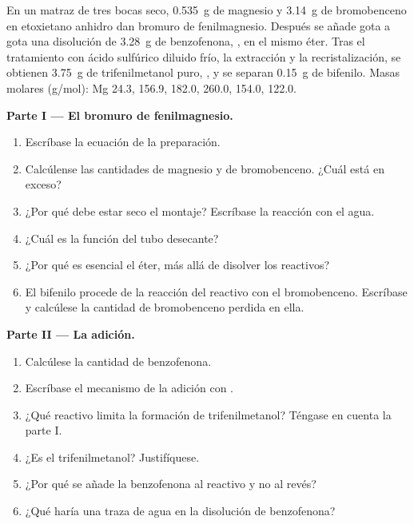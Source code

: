 \begin{problem}
\label{pb:b1:organomagnesium:1}
En un matraz de tres bocas seco, \qty{0.535}{g} de magnesio y
\qty{3.14}{g} de bromobenceno en etoxietano anhidro dan bromuro de
fenilmagnesio. Después se añade gota a gota una disolución de
\qty{3.28}{g} de benzofenona, , en el mismo éter. Tras el
tratamiento con ácido sulfúrico diluido frío, la extracción y la
recristalización, se obtienen \qty{3.75}{g} de trifenilmetanol puro,
, y se separan \qty{0.15}{g} de bifenilo. Masas molares
(\unit{g/mol}): Mg 24.3,  156.9,  182.0,
 260.0,
 154.0,  122.0.

\medskip
\noindent\textbf{Parte I --- El bromuro de fenilmagnesio.}
\begin{enumerate}
  \item Escríbase la ecuación de la preparación.
  \item Calcúlense las cantidades de magnesio y de bromobenceno. ¿Cuál
        está en exceso?
  \item ¿Por qué debe estar seco el montaje? Escríbase la reacción con el
        agua.
  \item ¿Cuál es la función del tubo desecante?
  \item ¿Por qué es esencial el éter, más allá de disolver los reactivos?
  \item El bifenilo procede de la reacción del reactivo con el
        bromobenceno. Escríbase y calcúlese la cantidad de bromobenceno
        perdida en ella.
\end{enumerate}

\medskip
\noindent\textbf{Parte II --- La adición.}
\begin{enumerate}[resume]
  \item Calcúlese la cantidad de benzofenona.
  \item Escríbase el mecanismo de la adición con .
  \item ¿Qué reactivo limita la formación de trifenilmetanol? Téngase en
        cuenta la parte I.
  \item ¿Es  el trifenilmetanol? Justifíquese.
  \item ¿Por qué se añade la benzofenona al reactivo y no al revés?
  \item ¿Qué haría una traza de agua en la disolución de benzofenona?
\end{enumerate}


\end{problem}
